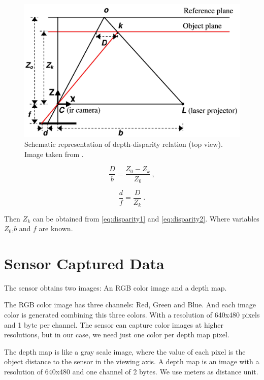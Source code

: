 \begin{figure}[h!]
\begin{center}
\includegraphics[scale=1.65]{images/kinect_triangulation}
\caption{Schematic representation of depth-disparity relation (top view). Image taken from \cite{khoshelham2011accuracy}.}
\label{fig:disparity}
\end{center}
\end{figure}

\begin{equation}
\label{eq:disparity1}
 \frac{D}{b} = \frac{Z_0 - Z_k}{Z_0}\ ,
\end{equation}


\begin{equation}
\label{eq:disparity2}
 \frac{d}{f} = \frac{D}{Z_k}\ . 
\end{equation}

Then $Z_k$ can be obtained from \ref{eq:disparity1} and \ref{eq:disparity2}. Where variables $Z_0$,$b$ and $f$ are known.

\section{Sensor Captured Data}
\label{sec:sensor_data}

The sensor obtains two images: An RGB color image and a depth map. 

The RGB color image has three channels: Red, Green and Blue. And each image color is generated 
combining this three colors. With a resolution of 640x480 pixels and 1 byte per channel. The sensor can 
capture color images at higher resolutions, but in our case, we need just one color per depth map pixel.

The depth map is like a gray scale image, where the value of each pixel is the object distance to the sensor in the viewing axis. 
A depth map is an image with a resolution of 640x480 and one channel of 2 bytes. We use meters as distance unit.

